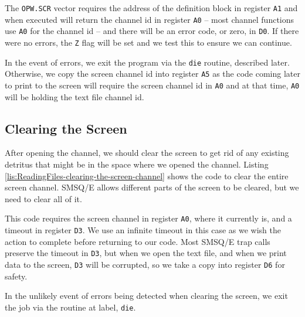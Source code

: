 

The \texttt{OPW.SCR} vector requires the address of the definition
block in register \texttt{A1} and when executed will return the channel
id in register \texttt{A0} -- most channel functions use \texttt{A0}
for the channel id -- and there will be an error code, or zero, in
\texttt{D0}. If there were no errors, the \texttt{Z} flag will be
set and we test this to ensure we can continue.

In the event of errors, we exit the program via the \texttt{die} routine,
described later. Otherwise, we copy the screen channel id into register
\texttt{A5} as the code coming later to print to the screen will require
the screen channel id in \texttt{A0} and at that time, \texttt{A0}
will be holding the text file channel id.

\subsection{Clearing the Screen}

After opening the channel, we should clear the screen to get rid of
any existing detritus that might be in the space where we opened the
channel. Listing \ref{lis:ReadingFiles-clearing-the-screen-channel}
shows the code to clear the entire screen channel. SMSQ/E allows different
parts of the screen to be cleared, but we need to clear all of it.



This code requires the screen channel in register \texttt{A0}, where
it currently is, and a timeout in register \texttt{D3}. We use an
infinite timeout in this case as we wish the action to complete before
returning to our code. Most SMSQ/E trap calls preserve the timeout
in \texttt{D3}, but when we open the text file, and when we print
data to the screen, \texttt{D3} will be corrupted, so we take a copy
into register \texttt{D6} for safety.

In the unlikely event of errors being detected when clearing the screen,
we exit the job via the routine at label, \texttt{die}.

